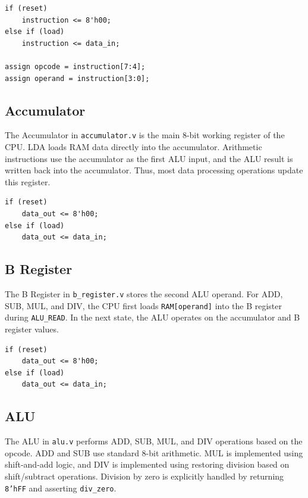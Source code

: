 \documentclass[12pt,a4paper]{article}
\begin{document}
\begin{lstlisting}[style=verilogstyle,caption={Instruction Register field extraction}]
if (reset)
    instruction <= 8'h00;
else if (load)
    instruction <= data_in;

assign opcode = instruction[7:4];
assign operand = instruction[3:0];
\end{lstlisting}

\subsection{Accumulator}

The Accumulator in \texttt{accumulator.v} is the main 8-bit working register of the CPU. LDA loads RAM data directly into the accumulator. Arithmetic instructions use the accumulator as the first ALU input, and the ALU result is written back into the accumulator. Thus, most data processing operations update this register.

\begin{lstlisting}[style=verilogstyle,caption={Accumulator register logic}]
if (reset)
    data_out <= 8'h00;
else if (load)
    data_out <= data_in;
\end{lstlisting}

\subsection{B Register}

The B Register in \texttt{b\_register.v} stores the second ALU operand. For ADD, SUB, MUL, and DIV, the CPU first loads \texttt{RAM[operand]} into the B register during \texttt{ALU\_READ}. In the next state, the ALU operates on the accumulator and B register values.

\begin{lstlisting}[style=verilogstyle,caption={B Register load logic}]
if (reset)
    data_out <= 8'h00;
else if (load)
    data_out <= data_in;
\end{lstlisting}

\subsection{ALU}

The ALU in \texttt{alu.v} performs ADD, SUB, MUL, and DIV operations based on the opcode. ADD and SUB use standard 8-bit arithmetic. MUL is implemented using shift-and-add logic, and DIV is implemented using restoring division based on shift/subtract operations. Division by zero is explicitly handled by returning \texttt{8'hFF} and asserting \texttt{div\_zero}.
\end{document}
